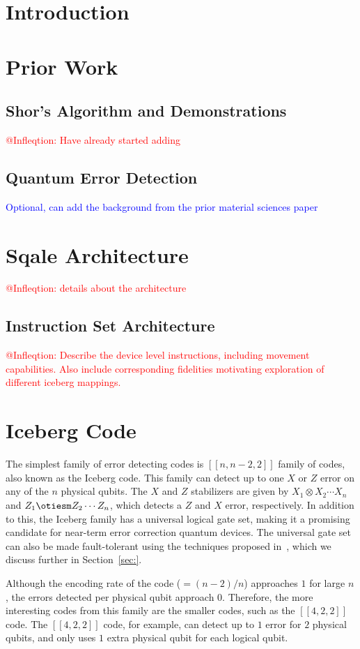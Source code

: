 \section{Introduction}

\section{Prior Work}

\subsection{Shor's Algorithm and Demonstrations}
\textcolor{red}{@Infleqtion: Have already started adding}

\subsection{Quantum Error Detection}
\textcolor{blue}{Optional, can add the background from the prior material sciences paper}

\section{Sqale Architecture}
\textcolor{red}{@Infleqtion: details about the architecture}

\subsection{Instruction Set Architecture}
\textcolor{red}{@Infleqtion: Describe the device level instructions, including movement capabilities. Also include corresponding fidelities motivating exploration of different iceberg mappings.}


\section{Iceberg Code}
The simplest family of error detecting codes is $[[n, n-2, 2]]$ family of codes, also known as the Iceberg code\cite{}. This family can detect up to one $X$ or $Z$ error on any of the $n$ physical qubits. The $X$ and $Z$ stabilizers are given by $X_1 \otimes X_2 \cdots X_n$ and $Z_1 \otiesm Z_2 \cdots Z_n$, which detects a $Z$ and $X$ error, respectively. In addition to this, the Iceberg family has a universal logical gate set\cite{}, making it a promising candidate for near-term error correction quantum devices. The universal gate set can also be made fault-tolerant using the techniques proposed in~\cite{}, which we discuss further in Section~\ref{sec:}. \par
Although the encoding rate of the code ($= (n-2)/n$) approaches $1$ for large $n$, the errors detected per physical qubit approach $0$. Therefore, the more interesting codes from this family are the smaller codes, such as the $[[4, 2, 2]]$ code. The $[[4, 2, 2]]$ code, for example, can detect up to $1$ error for $2$ physical qubits, and only uses $1$ extra physical qubit for each logical qubit.

